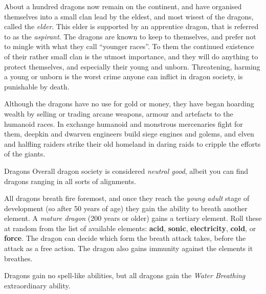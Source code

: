 About a hundred dragons now remain on the continent, and have organised
themselves into a small clan lead by the eldest, and most wisest of the
dragons, called the \emph{elder}. This elder is supported by an apprentice
dragon, that is referred to as the \emph{aspirant}. The dragons are known to
keep to themselves, and prefer not to mingle with what they call ``younger
races''. To them the continued existence of their rather small clan is the
utmost importance, and they will do anything to protect themselves, and
especially their young and unborn. Threatening, harming a young or unborn is
the worst crime anyone can inflict in dragon society, is punishable by death.

Although the dragons have no use for gold or money, they have began hoarding
wealth by selling or trading arcane weapons, armour and artefacts to the
humanoid races. In exchange humanoid and monstrous mercenaries fight for them,
deepkin and dwarven engineers build siege engines and golems, and elven and
halfling raiders strike their old homeland in daring raids to cripple the
efforts of the giants.

\begin{35e}{Dragons}
  Overall dragon society is considered \emph{neutral good}, albeit you can
  find dragons ranging in all sorts of alignments.

  All dragons breath fire foremost, and once they reach the \emph{young adult}
  stage of development (so after 50 years of age) they gain the ability to
  breath another element. A \emph{mature dragon} (200 years or older) gains a
  tertiary element. Roll these at random from the list of available elements:
  \textbf{acid}, \textbf{sonic}, \textbf{electricity}, \textbf{cold}, or
  \textbf{force}. The dragon can decide which form the breath attack takes,
  before the attack as a free action. The dragon also gains immunity against
  the elements it breathes.

  Dragons gain no spell-like abilities, but all dragons gain the \emph{Water
    Breathing} extraordinary ability.
\end{35e}
